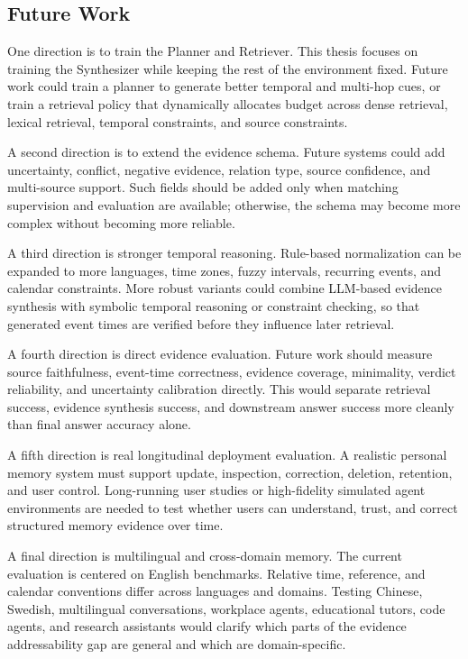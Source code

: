 \subsection{Future Work}
\label{subsec:conclusion-future-work}

One direction is to train the Planner and Retriever. This thesis focuses on
training the Synthesizer while keeping the rest of the environment fixed.
Future work could train a planner to generate better temporal and multi-hop
cues, or train a retrieval policy that dynamically allocates budget across
dense retrieval, lexical retrieval, temporal constraints, and source
constraints.

A second direction is to extend the evidence schema. Future systems could add
uncertainty, conflict, negative evidence, relation type, source confidence, and
multi-source support. Such fields should be added only when matching
supervision and evaluation are available; otherwise, the schema may become more
complex without becoming more reliable.

A third direction is stronger temporal reasoning. Rule-based normalization can
be expanded to more languages, time zones, fuzzy intervals, recurring events,
and calendar constraints. More robust variants could combine LLM-based
evidence synthesis with symbolic temporal reasoning or constraint checking, so
that generated event times are verified before they influence later retrieval.

A fourth direction is direct evidence evaluation. Future work should measure
source faithfulness, event-time correctness, evidence coverage, minimality,
verdict reliability, and uncertainty calibration directly. This would separate
retrieval success, evidence synthesis success, and downstream answer success
more cleanly than final answer accuracy alone.

A fifth direction is real longitudinal deployment evaluation. A realistic
personal memory system must support update, inspection, correction, deletion,
retention, and user control. Long-running user studies or high-fidelity
simulated agent environments are needed to test whether users can understand,
trust, and correct structured memory evidence over time.

A final direction is multilingual and cross-domain memory. The current
evaluation is centered on English benchmarks. Relative time, reference, and
calendar conventions differ across languages and domains. Testing Chinese,
Swedish, multilingual conversations, workplace agents, educational tutors, code
agents, and research assistants would clarify which parts of the evidence
addressability gap are general and which are domain-specific.

